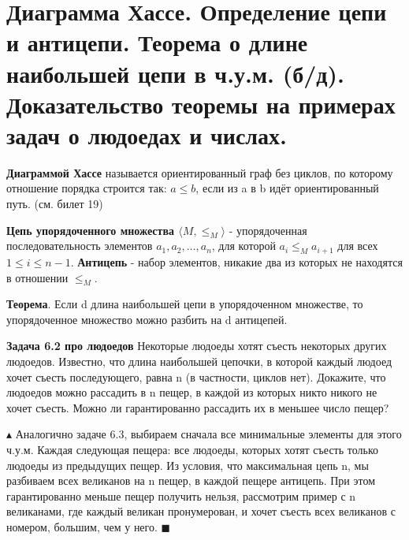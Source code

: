 \setcounter{section}{19}

\section{Диаграмма Хассе. Определение цепи и антицепи. Теорема о длине наибольшей цепи в ч.у.м. (б/д). Доказательство теоремы на примерах задач о людоедах и числах.}
\textbf{Диаграммой Хассе} называется ориентированный граф без циклов, по которому отношение порядка строится так: $a \leqslant b$, если из a в b идёт ориентированный путь. (см. билет 19) \\ \par

\textbf{Цепь упорядоченного множества $\langle M, \leqslant_M \rangle$} - упорядоченная последовательность элементов $a_1, a_2, \dots, a_n$, для которой $a_i \leqslant_M a_{i+1} $ для всех $1 \leqslant i \leqslant n-1$. \textbf{Антицепь} - набор элементов, никакие два из которых не находятся в отношении $\leqslant_M$. \\ \par
\textbf{Теорема}. Если d длина наибольшей цепи в упорядоченном множестве, то упорядоченное множество можно разбить на d антицепей. \par
\textbf{Задача 6.2 про людоедов} Некоторые людоеды хотят съесть некоторых других людоедов. Известно, что длина наибольшей
цепочки, в которой каждый людоед хочет съесть последующего, равна n (в частности, циклов нет). Докажите, что людоедов можно рассадить в n пещер, в каждой из которых никто никого не хочет съесть. Можно ли гарантированно рассадить их в меньшее число пещер? \par
$\blacktriangle$
Аналогично задаче 6.3, выбираем сначала все минимальные элементы для этого ч.у.м. Каждая следующая пещера: все людоеды, которых хотят съесть только людоеды из предыдущих пещер. Из условия, что максимальная цепь n, мы разбиваем всех великанов на n пещер, в каждой пещере антицепь. При этом гарантированно меньше пещер получить нельзя, рассмотрим пример с n великанами, где каждый великан пронумерован, и хочет съесть всех великанов с номером, большим, чем у него.
$\blacksquare$ \\ \par

